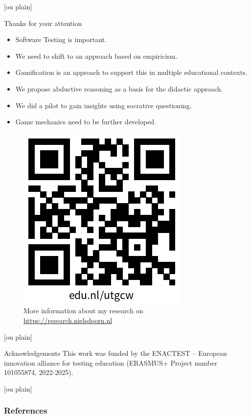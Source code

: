\documentclass[aspectratio=169]{beamer}
\begin{document}
[ou plain]
\begin{frame}{Thanks for your attention}

\begin{itemize}
    \item Software Testing is important.
    \item We need to shift to an approach based on empiricism.
    \item Gamification is an approach to support this in multiple educational contexts.
    \item We propose abductive reasoning as a basis for the didactic approach.
    \item We did a pilot to gain insights using socrative questioning.
    \item Game mechanics need to be further developed.
\end{itemize}


\begin{figure}
    \centering
    \includegraphics[width=0.25\linewidth]{images//qr.png}
    \caption{More information about my research on \url{https://research.nielsdoorn.nl}}
\end{figure}
\end{frame}

[ou plain]
\begin{frame}{Acknowledgements}
    This work was funded by the ENACTEST -- European innovation alliance for testing education (ERASMUS+ Project number 101055874, 2022-2025). %
\end{frame}

[ou plain]
\begin{frame}[allowframebreaks]
    \frametitle{References}
    \printbibliography
\end{frame}
\end{document}
